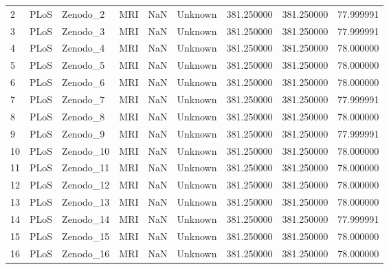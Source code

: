 \begin{tabular}{llllrlrrr}
2      &            PLoS &     Zenodo\_2 &                MRI &        NaN &  Unknown &       381.250000 &    381.250000 &   77.999991 \\
3      &            PLoS &     Zenodo\_3 &                MRI &        NaN &  Unknown &       381.250000 &    381.250000 &   77.999991 \\
4      &            PLoS &     Zenodo\_4 &                MRI &        NaN &  Unknown &       381.250000 &    381.250000 &   78.000000 \\
5      &            PLoS &     Zenodo\_5 &                MRI &        NaN &  Unknown &       381.250000 &    381.250000 &   78.000000 \\
6      &            PLoS &     Zenodo\_6 &                MRI &        NaN &  Unknown &       381.250000 &    381.250000 &   78.000000 \\
7      &            PLoS &     Zenodo\_7 &                MRI &        NaN &  Unknown &       381.250000 &    381.250000 &   77.999991 \\
8      &            PLoS &     Zenodo\_8 &                MRI &        NaN &  Unknown &       381.250000 &    381.250000 &   78.000000 \\
9      &            PLoS &     Zenodo\_9 &                MRI &        NaN &  Unknown &       381.250000 &    381.250000 &   77.999991 \\
10     &            PLoS &    Zenodo\_10 &                MRI &        NaN &  Unknown &       381.250000 &    381.250000 &   78.000000 \\
11     &            PLoS &    Zenodo\_11 &                MRI &        NaN &  Unknown &       381.250000 &    381.250000 &   78.000000 \\
12     &            PLoS &    Zenodo\_12 &                MRI &        NaN &  Unknown &       381.250000 &    381.250000 &   78.000000 \\
13     &            PLoS &    Zenodo\_13 &                MRI &        NaN &  Unknown &       381.250000 &    381.250000 &   78.000000 \\
14     &            PLoS &    Zenodo\_14 &                MRI &        NaN &  Unknown &       381.250000 &    381.250000 &   77.999991 \\
15     &            PLoS &    Zenodo\_15 &                MRI &        NaN &  Unknown &       381.250000 &    381.250000 &   78.000000 \\
16     &            PLoS &    Zenodo\_16 &                MRI &        NaN &  Unknown &       381.250000 &    381.250000 &   78.000000 \\

\end{tabular}
